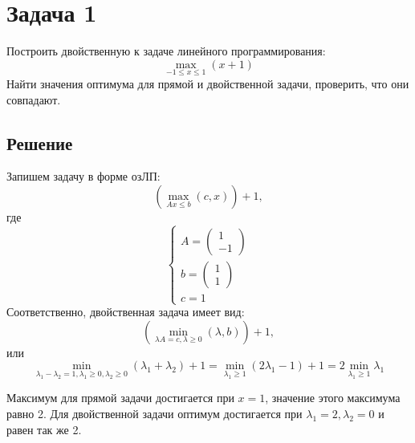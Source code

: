 \documentclass[11pt]{article}
\author{Sergey Makarov}
\date{\today}
\title{}
\begin{document}
\section{Задача 1}
\label{sec:orgd3ef870}
Построить двойственную к задаче линейного программирования:
\begin{equation}
\max_{-1 \leq x \leq 1} (x + 1)
\end{equation}
Найти значения оптимума для прямой и двойственной задачи, проверить, что они совпадают.
\subsection{Решение}
\label{sec:org20095c9}
Запишем задачу в форме озЛП:
\begin{equation}
(\max_{Ax \leq b}(c, x)) + 1,
\end{equation}
где
\begin{equation}
\begin{cases}
A = \begin{pmatrix}
1 \\
-1
\end{pmatrix}\\
b = \begin{pmatrix}
1 \\
1
\end{pmatrix}\\
c = 1
\end{cases}
\end{equation}
Соответственно, двойственная задача имеет вид:
\begin{equation}
(\min_{\lambda A = c, \lambda \geq 0}(\lambda, b)) + 1,
\end{equation}
или
\begin{equation}
\min_{\lambda_1 - \lambda_2 = 1, \lambda_1 \geq 0, \lambda_2 \geq 0}(\lambda_1 + \lambda_2) + 1 = 
\min_{\lambda_1 \geq 1}(2\lambda_1 - 1) + 1 = 2\min_{\lambda_1 \geq 1}\lambda_1
\end{equation}

Максимум для прямой задачи достигается при $x = 1$, значение этого максимума равно 2.
Для двойственной задачи оптимум достигается при $\lambda_1 = 2, \lambda_2 = 0$ и равен так же 2.
\end{document}
